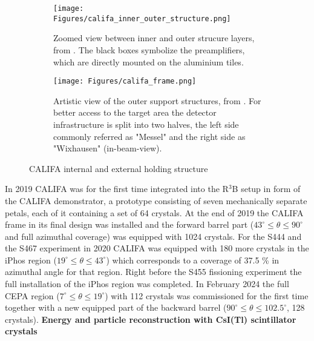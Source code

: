 \begin{figure}
     \centering
     \begin{subfigure}[b]{0.4\textwidth}
         \centering
         \texttt{[image: Figures/califa\_inner\_outer\_structure.png]}
         \caption{Zoomed view between inner and outer strucure layers, from \cite{tdr:barrel}. The black boxes symbolize the preamplifiers, which are directly mounted on the aluminium tiles.}
         \label{fig:califa_frame_zoom}
     \end{subfigure}
     \hfill
     \begin{subfigure}[b]{0.4\textwidth}
         \centering
         \texttt{[image: Figures/califa\_frame.png]}
         \caption{Artistic view of the outer support structures, from \cite{tdr:endcap}. For better access to the target area the detector infrastructure is split into two halves, the left side commonly referred as "Messel" and the right side as "Wixhausen" (in-beam-view).}
         \label{fig:califa_frame}
     \end{subfigure}
     \hfill
        \caption{CALIFA internal and external holding structure}
        \label{fig:califa_holding_structure}
\end{figure}
In 2019 CALIFA was for the first time integrated into the R$^3$B setup in form of the CALIFA demonstrator, a prototype consisting of seven mechanically separate petals, each of it containing a set of 64 crystals.\newline
At the end of 2019 the CALIFA frame in its final design was installed and the forward barrel part ($43^{\circ} \leq \theta \leq 90^{\circ}$ and full azimuthal coverage) was equipped with 1024 crystals.\newline
For the S444 and the S467 experiment in 2020 CALIFA was equipped with 180 more crystals in the iPhos region ($19^{\circ} \leq \theta \leq 43^{\circ}$) which corresponds to a coverage of 37.5 \% in azimuthal angle for that region. Right before the S455 fissioning experiment \cite{grana2023fission} the full installation of the iPhos region was completed.\newline
In February 2024 the full CEPA region ($7^{\circ} \leq \theta \leq 19^{\circ}$) with 112 crystals was commissioned for the first time together with a new equipped part of the backward barrel ($90^{\circ} \leq \theta \leq 102.5^{\circ}$, 128 crystals).\newline   
\textbf{Energy and particle reconstruction with CsI(Tl) scintillator crystals}\newline
